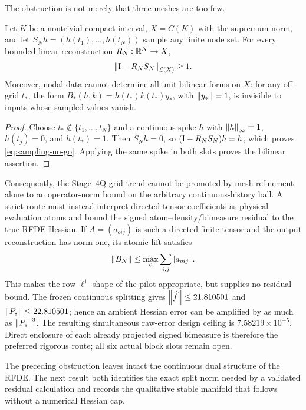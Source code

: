 The obstruction is not merely that three meshes are too few.

\begin{lemma}
\label{lem:finite-sampling-obstruction}
Let \(K\) be a nontrivial compact interval,
\(X=C(K)\) with the supremum norm, and let
\(S_Nh=(h(t_1),\ldots,h(t_N))\) sample any finite node set.  For every
bounded linear reconstruction \(R_N:\mathbb R^N\to X\),
\begin{equation}
 \left\lVert\mathrm I-R_NS_N\right\rVert_{\mathcal L(X)}\ge1.                \label{eq:sampling-no-go}
\end{equation}
Moreover, nodal data cannot determine all unit bilinear forms on \(X\): for
any off-grid \(t_*\), the form
\(B_*(h,k)=h(t_*)k(t_*)y_*\), with \(\left\lVert y_*\right\rVert=1\), is invisible to inputs
whose sampled values vanish.
\end{lemma}

\begin{proof}
Choose \(t_*\notin\{t_1,\ldots,t_N\}\) and a continuous spike \(h\) with
\(\left\lVert h\right\rVert_\infty=1\), \(h(t_j)=0\), and \(h(t_*)=1\).  Then \(S_Nh=0\), so
\((\mathrm I-R_NS_N)h=h\), which proves \cref{eq:sampling-no-go}.  Applying the
same spike in both slots proves the bilinear assertion.
\end{proof}

Consequently, the Stage--4Q grid trend cannot be promoted by mesh refinement
alone to an operator-norm bound on the arbitrary continuous-history ball.
A strict route must instead interpret directed tensor coefficients as
physical evaluation atoms and bound the signed atom--density/bimeasure
residual to the true RFDE Hessian.  If \(A=(a_{oij})\) is such a directed
finite tensor and the output reconstruction has norm one, its atomic lift
satisfies
\begin{equation}
 \left\lVert B_N\right\rVert\le\max_o\sum_{i,j}\left\lvert a_{oij}\right\rvert.           \label{eq:atomic-bimeasure-lift}
\end{equation}
This makes the row-\(\ell^1\) shape of the pilot appropriate, but supplies no
residual bound.  The frozen continuous splitting gives
\(\left\lVert\widehat f\right\rVert\le21.810501\) and
\(\left\lVert P_s\right\rVert\le22.810501\); hence an ambient Hessian error can be amplified
by as much as \(\left\lVert P_s\right\rVert^3\).  The resulting simultaneous raw-error design
ceiling is \(7.58219\times10^{-5}\).  Direct enclosure of each already
projected signed bimeasure is therefore the preferred rigorous route; all six
actual block slots remain open.

The preceding obstruction leaves intact the continuous dual structure of the
RFDE.  The next result both identifies the exact split norm needed by a
validated residual calculation and records the qualitative stable manifold
that follows without a numerical Hessian cap.

